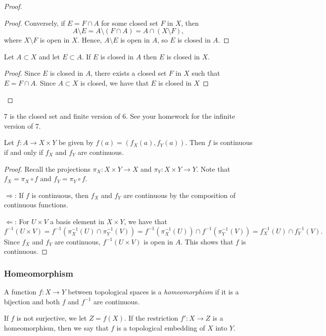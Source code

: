 \begin{proof}
\begin{enumerate}
\begin{proof}
  Conversely, if $E = F \cap A$ for some closed set $F$ in $X$, then
  \[
  A \setminus E = A \setminus (F \cap A) = A \cap (X \setminus F),
  \]
  where $X \setminus F$ is open in $X$. Hence, $A \setminus E$ is open in $A$, so $E$ is closed in $A$.
\end{proof}
\begin{corollary}
  Let $A\subset X$ and let $E\subset A$. If $E$ is closed in $A$ then $E$ is closed in $X$.
\end{corollary}
\begin{proof}
  Since $E$ is closed in $A$, there exists a closed set $F$ in $X$ such that $E=F\cap A$. Since $A\subset X$ is closed, we have that $E$ is closed in $X$
\end{proof}
  \end{enumerate}
\end{proof}
  


\begin{remark}
  7 is the closed set and finite version of 6. See your homework for the infinite version of 7.
\end{remark}

\begin{theorem}
  Let $f:A\to X\times Y$ be given by $f(a)=(f_X(a),f_Y(a))$. Then $f$ is continuous if and only if $f_X$ and $f_Y$ are continuous.
\end{theorem}
\begin{proof}
  Recall the projections $\pi_X:X\times Y\to X$ and $\pi_Y:X\times Y\to Y$. Note that $f_X=\pi_X\circ f$ and $f_Y=\pi_Y\circ f$. 

  $\Rightarrow$: If $f$ is continuous, then $f_X$ and $f_Y$ are continuous by the composition of continuous functions.

  $\Leftarrow$: For $U\times V$ a basis element in $X\times Y$, we have that
  \[f^{-1}(U\times V) = f^{-1}(\pi_X^{-1}(U)\cap \pi_Y^{-1}(V)) = f^{-1}(\pi_X^{-1}(U))\cap f^{-1}(\pi_Y^{-1}(V)) = f_X^{-1}(U)\cap f_Y^{-1}(V).\]
  Since $f_X$ and $f_Y$ are continuous, $f^{-1}(U\times V)$ is open in $A$. This shows that $f$ is continuous.
\end{proof}


\subsubsection{Homeomorphism}
\begin{definition}
  A function \(f: X \to Y\) between topological spaces is a \emph{homeomorphism} if it is a bijection and both \(f\) and \(f^{-1}\) are continuous. 

  If $f$ is not surjective, we let $Z=f(X)$. If the restriction $f':X\to Z$ is a homeomorphism, then we say that $f$ is a topological embedding of $X$ into $Y$.
\end{definition}

